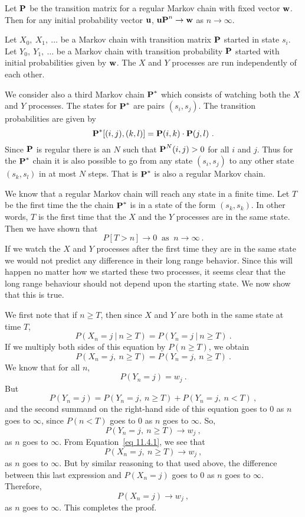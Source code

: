 \begin{theorem}\label{thm 11.4.1}
Let ${\mbox{\bf P}\/}$ be the transition matrix for a regular Markov chain with fixed
vector
${\mbox{\bf w}\/}$.  Then for any initial probability vector ${\mbox{\bf u}\/}$, 
${\mbox{\bf uP}\/}^n \rightarrow {\mbox{\bf w}\/}$ as $n \rightarrow \infty.$ 

\proof  Let $ X_0,\ X_1,\ \ldots$ be a Markov
chain with transition matrix ${\mbox{\bf P}\/}$ started in state $s_i$.  Let $Y_0,\
Y_1,\ \ldots$  be a Markov
chain with transition probability ${\mbox{\bf P}\/}$ started with initial probabilities
given by
${\mbox{\bf w}\/}$.   The $X$ and $Y$ processes are run independently of each other.
\par
We consider also a third Markov chain  ${\mbox{\bf P}\/}^*$  which consists of watching
both the
$X$ and $Y$ processes.  The states for ${\mbox{\bf P}\/}^*$
are pairs $(s_i, s_j)$.  The transition probabilities are given by 
$${\mbox{\bf P}\/}^{*}[(i,j),(k,l)] = {\mbox{\bf P}\/}(i,k) \cdot  {\mbox{\bf P}\/}(j,l)\ .$$   
Since ${\mbox{\bf P}\/}$ is regular there is an $N$ such that ${\mbox{\bf P}\/}^{N}(i,j) > 0$ for
all $i$
and
$j$.  Thus for the
${\mbox{\bf P}\/}^*$ chain it is also possible to go from any state $(s_i, s_j)$ to any
other state
$(s_k,s_l)$ in at most $N$ steps.  That is ${\mbox{\bf P}\/}^*$ is also a regular Markov
chain. 
\par
We know that a regular Markov chain will reach any state in a finite time.  Let
$T$ be
the first time the the chain ${\mbox{\bf P}\/}^*$ is in a state of the form $(s_k,s_k)$. 
In other words,
$T$ is the first time that the $X$ and the $Y$ processes are in the same state. 
Then we have shown that
$$
P[T > n] \rightarrow 0 \;\;\mbox{as}\;\; n \rightarrow \infty\ .
$$
If we watch the $X$ and $Y$ processes after the first time they are in the same
state we would not predict any difference in their long range behavior. Since
this will
happen no matter how we started these two processes, it seems clear that the
long range
behaviour should not depend upon the starting state.  We now show that this is
true.  
\par
We first note that if $n \ge T$, then since $X$ and $Y$ are both in the
same state at time $T$,
$$
P(X_n = j\ |\ n \ge T) = P(Y_n = j\ |\ n \ge T)\ .
$$
If we multiply both sides of this equation by $P(n \ge T)$, we obtain
\begin{equation}
P(X_n = j,\ n \ge T) = P(Y_n = j,\ n \ge T)\ .
\label{eq 11.4.1}
\end{equation}
We know that for all $n$, 
$$P(Y_n = j) = w_j\ .$$
But
$$P(Y_n = j) = P(Y_n = j,\ n \ge T) + P(Y_n = j,\ n < T)\ ,$$
and the second summand on the right-hand side of this equation goes to 0 as $n$
goes to
$\infty$, since $P(n < T)$ goes to 0 as $n$ goes to $\infty$.  So,
$$P(Y_n = j,\ n \ge T) \rightarrow w_j\ ,$$
as $n$ goes to $\infty$.  From Equation~\ref{eq 11.4.1}, we see that
$$P(X_n = j,\ n \ge T) \rightarrow w_j\ ,$$
as $n$ goes to $\infty$.  But by similar reasoning to that used above, the
difference
between this last expression and $P(X_n = j)$ goes to 0 as $n$ goes to
$\infty$.  Therefore,
$$P(X_n = j) \rightarrow w_j\ ,$$
as $n$ goes to $\infty$.  This completes the proof.
\end{theorem}
